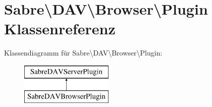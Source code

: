 \hypertarget{class_sabre_1_1_d_a_v_1_1_browser_1_1_plugin}{}\section{Sabre\textbackslash{}D\+AV\textbackslash{}Browser\textbackslash{}Plugin Klassenreferenz}
\label{class_sabre_1_1_d_a_v_1_1_browser_1_1_plugin}
Klassendiagramm für Sabre\textbackslash{}D\+AV\textbackslash{}Browser\textbackslash{}Plugin\+:\begin{figure}[H]
\begin{center}
\leavevmode
\includegraphics[height=2.000000cm]{class_sabre_1_1_d_a_v_1_1_browser_1_1_plugin}
\end{center}
\end{figure}
